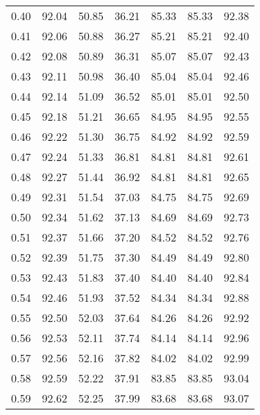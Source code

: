 \begin{tabular}{|c|c|c|c|c|c|c|}
      0.40 &     92.04 &     50.85 &      36.21 &   85.33 &      85.33 &         92.38 \\
      0.41 &     92.06 &     50.88 &      36.27 &   85.21 &      85.21 &         92.40 \\
      0.42 &     92.08 &     50.89 &      36.31 &   85.07 &      85.07 &         92.43 \\
      0.43 &     92.11 &     50.98 &      36.40 &   85.04 &      85.04 &         92.46 \\
      0.44 &     92.14 &     51.09 &      36.52 &   85.01 &      85.01 &         92.50 \\
      0.45 &     92.18 &     51.21 &      36.65 &   84.95 &      84.95 &         92.55 \\
      0.46 &     92.22 &     51.30 &      36.75 &   84.92 &      84.92 &         92.59 \\
      0.47 &     92.24 &     51.33 &      36.81 &   84.81 &      84.81 &         92.61 \\
      0.48 &     92.27 &     51.44 &      36.92 &   84.81 &      84.81 &         92.65 \\
      0.49 &     92.31 &     51.54 &      37.03 &   84.75 &      84.75 &         92.69 \\
      0.50 &     92.34 &     51.62 &      37.13 &   84.69 &      84.69 &         92.73 \\
      0.51 &     92.37 &     51.66 &      37.20 &   84.52 &      84.52 &         92.76 \\
      0.52 &     92.39 &     51.75 &      37.30 &   84.49 &      84.49 &         92.80 \\
      0.53 &     92.43 &     51.83 &      37.40 &   84.40 &      84.40 &         92.84 \\
      0.54 &     92.46 &     51.93 &      37.52 &   84.34 &      84.34 &         92.88 \\
      0.55 &     92.50 &     52.03 &      37.64 &   84.26 &      84.26 &         92.92 \\
      0.56 &     92.53 &     52.11 &      37.74 &   84.14 &      84.14 &         92.96 \\
      0.57 &     92.56 &     52.16 &      37.82 &   84.02 &      84.02 &         92.99 \\
      0.58 &     92.59 &     52.22 &      37.91 &   83.85 &      83.85 &         93.04 \\
      0.59 &     92.62 &     52.25 &      37.99 &   83.68 &      83.68 &         93.07 \\

\end{tabular}
